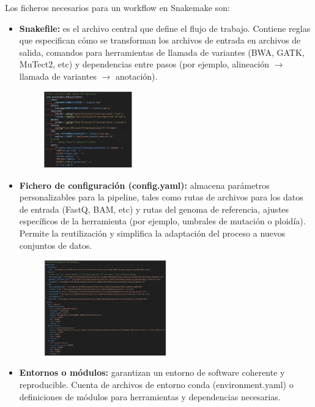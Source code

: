 Los ficheros necesarios para un workflow en Snakemake son:
\begin{itemize}
\item \textbf{Snakefile:} es el archivo central que define el flujo de trabajo. Contiene reglas que especifican cómo se transforman los archivos de entrada en archivos de salida, comandos para herramientas de llamada de variantes (BWA, GATK, MuTect2, etc) y dependencias entre pasos (por ejemplo, alineación $\rightarrow$ llamada de variantes $\rightarrow$ anotación).

\begin{figure}[h!]
\centering
\includegraphics[width = 0.36\textwidth]{figs/snakemake-rule.png}
\end{figure}

\item \textbf{Fichero de configuración (config.yaml):} almacena parámetros personalizables para la pipeline, tales como rutas de archivos para los datos de entrada (FastQ, BAM, etc) y rutas del genoma de referencia, ajustes específicos de la herramienta (por ejemplo, umbrales de mutación o ploidía). Permite la reutilización y simplifica la adaptación del proceso a nuevos conjuntos de datos.

\begin{figure}[htbp]
\centering
\includegraphics[width = 0.5\textwidth]{figs/snakemake-config.png}
\end{figure}

\item \textbf{Entornos o módulos:} garantizan un entorno de software coherente y reproducible. Cuenta de archivos de entorno conda (environment.yaml) o definiciones de módulos para herramientas y dependencias necesarias. 


\end{itemize}

